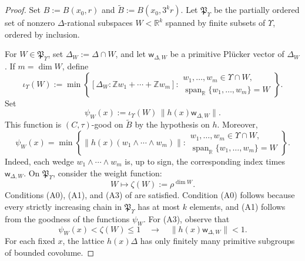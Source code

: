 \documentclass[reqno,11pt]{amsart}
\numberwithin{equation}{section}
\theoremstyle{definition}
\theoremstyle{remark}
\begin{document}
\begin{proof}
Set $B:=B(x_0,r)$ and $\widetilde B:=B(x_0,3^kr)$.
Let $\mathfrak P_\Upsilon$ be the partially ordered set of nonzero
$\Delta$-rational subspaces $W<\mathbb R^k$ spanned by finite subsets
of $\Upsilon$, ordered by inclusion.

For $W\in\mathfrak P_\Upsilon$, set
$\Delta_W:=\Delta\cap W$, and let $\mathsf w_{\Delta,W}$ be a primitive
Pl\"ucker vector of $\Delta_W$. If $m=\dim W$, define
$$
\iota_\Upsilon(W)
:=
\min
\left\{
[\Delta_W:\mathbb Zw_1+\cdots+\mathbb Zw_m]:
\begin{array}{l}
w_1,\dots,w_m\in\Upsilon\cap W,\\
\operatorname{span}_{\mathbb R}\{w_1,\dots,w_m\}=W
\end{array}
\right\}.
$$
 Set
$$
\psi_W(x)
:=
\iota_\Upsilon(W)\,
\|h(x)\mathsf w_{\Delta,W}\|.
$$
This function is $(C,\tau)$-good on $\widetilde B$ by the hypothesis on $h$. Moreover,
\begin{equation}\label{eq:selected-minimal-wedge}
\psi_W(x)
=
\min
\left\{
\|h(x)(w_1\wedge\cdots\wedge w_m)\|:
\begin{array}{l}
w_1,\dots,w_m\in\Upsilon\cap W,\\
\operatorname{span}_{\mathbb R}\{w_1,\dots,w_m\}=W
\end{array}
\right\}.
\end{equation}
Indeed, each wedge $w_1\wedge\cdots\wedge w_m$ is, up to sign, the
corresponding index times $\mathsf w_{\Delta,W}$. On $\mathfrak P_\Upsilon$, consider the weight function:
$$
W\mapsto \zeta(W):=\rho^{\dim W}.
$$
Conditions (A0), (A1), and (A3) of
\cite[Theorem~2.1]{kleinbock:2008} are satisfied. Condition (A0)
follows because every strictly increasing chain in
$\mathfrak P_\Upsilon$ has at most $k$ elements, and (A1) follows from
the goodness of the functions $\psi_W$. For (A3), observe that
$$
\psi_W(x)<\zeta(W)\le1
\quad\to\quad
\|h(x)\mathsf w_{\Delta,W}\|<1.
$$
For each fixed $x$, the lattice $h(x)\Delta$ has only finitely many
primitive subgroups of bounded covolume.


\end{proof}
\end{document}
